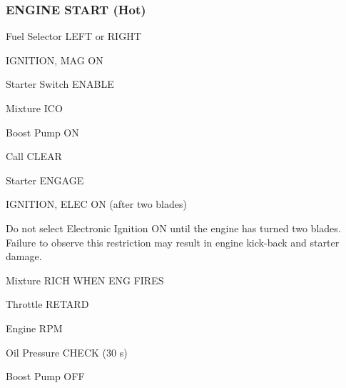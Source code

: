 \begin{multicols}{2}
\subsubsection*{ENGINE START (Hot)}
\begin{enumerate*}
\item Fuel Selector \dotfill LEFT or RIGHT
\item IGNITION, MAG \dotfill ON
\item Starter Switch \dotfill ENABLE
\item Mixture \dotfill ICO
\item Boost Pump \dotfill ON
\item Call \dotfill CLEAR
\item Starter \dotfill ENGAGE
\item IGNITION, ELEC \dotfill ON (after two blades)
\begin{Note}[CAUTION]
Do not select Electronic Ignition ON until the engine
has turned two blades. Failure to observe this restriction may result
in engine kick-back and starter damage.
\end{Note}
\item Mixture \dotfill RICH WHEN ENG FIRES
\item Throttle \dotfill RETARD
\item Engine  RPM
\item Oil Pressure \dotfill CHECK (30 s)
\item Boost Pump \dotfill OFF
\end{enumerate*}


\end{multicols}
